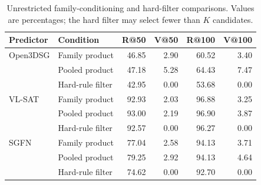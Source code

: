 \begin{table}[t]
\centering\small
\begin{tabular}{@{}llrrrr@{}}
\toprule
Predictor & Condition & R@50 & V@50 & R@100 & V@100 \\
\midrule
Open3DSG & Family product & 46.85 & 2.90 & 60.52 & 3.40 \\
 & Pooled product & 47.18 & 5.28 & 64.43 & 7.47 \\
 & Hard-rule filter & 42.95 & 0.00 & 53.68 & 0.00 \\
\midrule
VL-SAT & Family product & 92.93 & 2.03 & 96.88 & 3.25 \\
 & Pooled product & 93.00 & 2.19 & 96.90 & 3.87 \\
 & Hard-rule filter & 92.57 & 0.00 & 96.27 & 0.00 \\
\midrule
SGFN & Family product & 77.04 & 2.58 & 94.13 & 3.71 \\
 & Pooled product & 79.25 & 2.92 & 94.13 & 4.64 \\
 & Hard-rule filter & 74.62 & 0.00 & 92.70 & 0.00 \\
\bottomrule
\end{tabular}
\caption{Unrestricted family-conditioning and hard-filter comparisons. Values are percentages; the hard filter may select fewer than $K$ candidates.}
\label{tab:no-family-pooled-hard}
\end{table}
